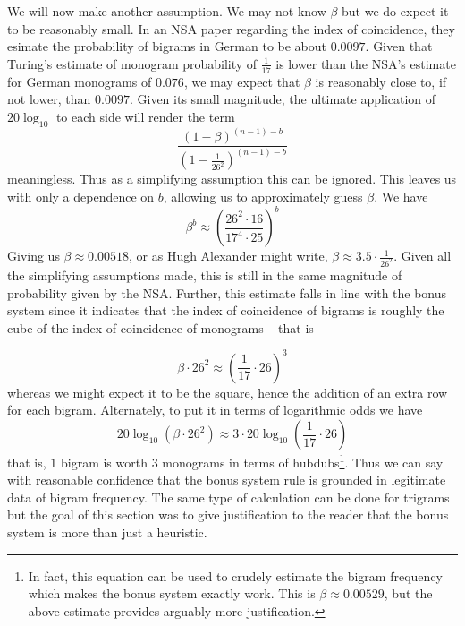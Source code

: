 \noindent We will now make another assumption. We may not know
$\beta$ but we do expect it to be reasonably small. In an NSA paper
regarding the index of coincidence, they esimate the probability of
bigrams in German to be about $0.0097$. Given that Turing's
estimate of monogram probability of $\frac{1}{17}$ is lower than
the NSA's estimate for German monograms of $0.076$, we may expect
that $\beta$ is reasonably close to, if not lower, than $0.0097$.
Given its small magnitude, the ultimate application of
$20\log_{10}$ to each side will render the term
\[
	\frac{(1-\beta)^{(n-1)-b}}{(1-\frac{1}{26^2})^{(n-1)-b}}
\]
meaningless. Thus as a simplifying assumption this can be ignored.
This leaves us with only a dependence on $b$, allowing us to
approximately guess $\beta$. We have
\[
	\beta^b \approx
	(\frac{26^2\cdot16}{17^4\cdot25})^b
\]
Giving us $\beta \approx 0.00518$, or as Hugh Alexander might
write, $\beta \approx 3.5\cdot\frac{1}{26^2}$. Given all the
simplifying assumptions made, this is still in the same magnitude
of probability given by the NSA. Further, this estimate falls in
line with the bonus system since it indicates that the index of
coincidence of bigrams is roughly the cube of the index of
coincidence of monograms -- that is

\[
	\beta\cdot26^2 \approx (\frac{1}{17}\cdot26)^3
\]
whereas we might expect it to be the square, hence the addition of
an extra row for each bigram. Alternately, to put it in terms of logarithmic odds we have
\[
	20\log_{10}(\beta\cdot26^2) \approx 3\cdot20\log_{10}(\frac{1}{17}\cdot26)
\]
that is, $1$ bigram is worth $3$ monograms in terms of hubdubs\footnote{In fact, this equation can be used to crudely estimate the bigram frequency which makes the bonus system exactly work. This is $\beta\approx0.00529$, but the above estimate provides arguably more justification.}. Thus we can say with reasonable
confidence that the bonus system rule is grounded in legitimate
data of bigram frequency. The same type of calculation can be done
for trigrams but the goal of this section was to give justification
to the reader that the bonus system is more than just a heuristic.

